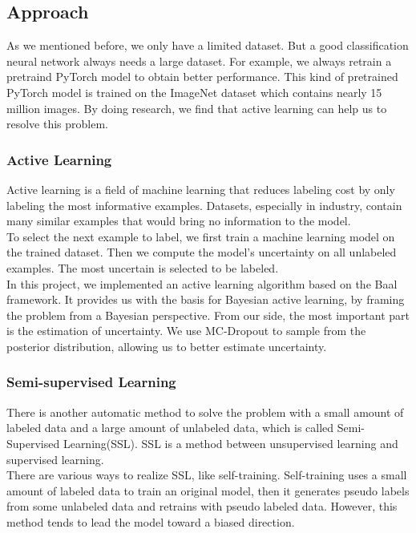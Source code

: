 \documentclass[lang=english,inputenc=utf8,fontsize=10pt]{ldvarticle}
\begin{document}
\subsection{Approach}
As we mentioned before, we only have a limited dataset. But a good classification neural network always needs a large dataset. For example, we always retrain a pretraind PyTorch model to obtain better performance. This kind of pretrained PyTorch model is trained on the ImageNet dataset which contains nearly 15 million images. By doing research, we find that active learning can help us to resolve this problem.

\subsubsection{Active Learning}
Active learning is a field of machine learning that reduces labeling cost by only labeling the most informative examples. Datasets, especially in industry, contain many similar examples that would bring no information to the model.\\

To select the next example to label, we first train a machine learning model on the trained dataset. Then we compute the model’s uncertainty on all unlabeled examples. The most uncertain is selected to be labeled.\\

In this project, we implemented an active learning algorithm based on the Baal framework. It provides us with the basis for Bayesian active learning, by framing the problem from a Bayesian perspective. From our side, the most important part is the estimation of uncertainty. We use MC-Dropout to sample from the posterior distribution, allowing us to better estimate uncertainty. \\

\subsubsection{Semi-supervised Learning}
There is another automatic method to solve the problem with a small amount of labeled data and a large amount of unlabeled data, which is called Semi-Supervised Learning(SSL). SSL is a method between unsupervised learning and supervised learning\cite{ref2}.\\

There are various ways to realize SSL, like self-training. Self-training uses a small amount of labeled data to train an original model, then it generates pseudo labels from some unlabeled data and retrains with pseudo labeled data. However, this method tends to lead the model toward a biased direction.\\
\end{document}
